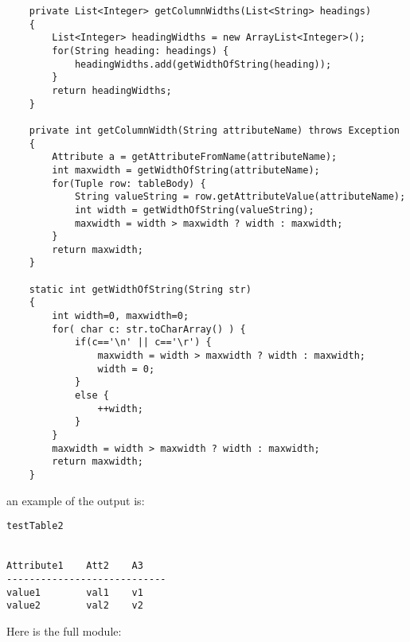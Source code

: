\documentclass[11pt]{article} %
\begin{document}
\begin{lstlisting}
    private List<Integer> getColumnWidths(List<String> headings)
    {
        List<Integer> headingWidths = new ArrayList<Integer>();
        for(String heading: headings) {
            headingWidths.add(getWidthOfString(heading));
        }
        return headingWidths;
    }
    
    private int getColumnWidth(String attributeName) throws Exception
    {
        Attribute a = getAttributeFromName(attributeName);
        int maxwidth = getWidthOfString(attributeName);
        for(Tuple row: tableBody) {
            String valueString = row.getAttributeValue(attributeName);
            int width = getWidthOfString(valueString);
            maxwidth = width > maxwidth ? width : maxwidth;
        }
        return maxwidth;
    }

    static int getWidthOfString(String str)
    {
        int width=0, maxwidth=0;
        for( char c: str.toCharArray() ) {
            if(c=='\n' || c=='\r') {
                maxwidth = width > maxwidth ? width : maxwidth;
                width = 0;
            }
            else {
                ++width;
            }
        }
        maxwidth = width > maxwidth ? width : maxwidth;
        return maxwidth;
    }

\end{lstlisting}

an example of the output is: 



\begin{lstlisting}
testTable2


Attribute1    Att2    A3    
----------------------------
value1        val1    v1    
value2        val2    v2    

\end{lstlisting}

Here is the full module:
\end{document}
